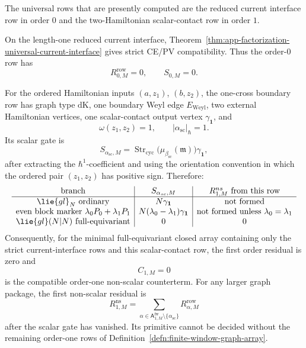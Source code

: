 \begin{prop}\label{prop:first-finite-window-array-rows}
  The universal rows that are presently computed are the reduced current
  interface row in order \(0\) and the two-Hamiltonian scalar-contact row in
  order \(1\).

  On the length-one reduced current interface,
  Theorem~\ref{thm:app-factorization-universal-current-interface} gives
  strict CE/PV compatibility.  Thus the order-\(0\) row has
  \[
    R^{\mathrm{row}}_{0,M}=0,\qquad S_{0,M}=0.
  \]

  For the ordered Hamiltonian inputs \((a,z_1)\), \((b,z_2)\), the
  one-cross boundary row has graph type \(\mathrm{dK}\), one boundary Weyl
  edge \(E_{\mathrm{Weyl}}\), two external Hamiltonian vertices, one
  scalar-contact output vertex \(\gamma_{\mathbf 1}\), and
  \[
    \omega(z_1,z_2)=1,\qquad |\alpha_{\mathrm{sc}}|_\hbar=1.
  \]
  Its scalar gate is
  \[
    S_{\alpha_{\mathrm{sc}},M}
      =
    \operatorname{Str}_{\mathrm{cyc}}
      \bigl(\mu_{\beta_{\mathrm{sc}}}(\mathfrak m)\bigr)
    \gamma_{\mathbf 1},
  \]
  after extracting the \(\hbar^1\)-coefficient and using the orientation
  convention in which the ordered pair \((z_1,z_2)\) has positive sign.
  Therefore:
  \[
  \begin{array}{c|c|c}
    \text{branch} & S_{\alpha_{\mathrm{sc}},M} &
    R^{\mathrm{ns}}_{1,M}\text{ from this row}\\ \hline
    \lie{gl}_N\text{ ordinary} & N\gamma_{\mathbf 1} & \text{not formed}\\
    \text{even block marker }\lambda_0P_{\bar0}+\lambda_1P_{\bar1}
      & N(\lambda_0-\lambda_1)\gamma_{\mathbf 1} & \text{not formed unless }
        \lambda_0=\lambda_1\\
    \lie{gl}(N|N)\text{ full-equivariant}
      & 0 & 0
  \end{array}
  \]
  Consequently, for the minimal full-equivariant closed array containing only
  the strict current-interface rows and this scalar-contact row, the first
  order residual is zero and
  \[
    C_{1,M}=0
  \]
  is the compatible order-one non-scalar counterterm.  For any larger graph
  package, the first non-scalar residual is
  \[
    R^{\mathrm{ns}}_{1,M}
      =
    \sum_{\alpha\in
      \mathsf A^{\mathrm{fw}}_{1,M}\setminus\{\alpha_{\mathrm{sc}}\}}
      R^{\mathrm{row}}_{\alpha,M}
  \]
  after the scalar gate has vanished.  Its primitive cannot be decided
  without the remaining order-one rows of
  Definition~\ref{defn:finite-window-graph-array}.
\end{prop}

